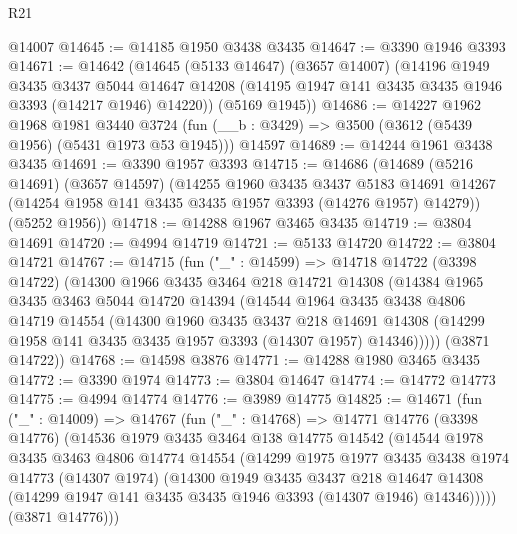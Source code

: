 \begin{lexlean}{R21}
\begin{coremodule}
    @14007
@14645 := @14185 @1950 @3438 @3435
@14647 := @3390 @1946 @3393
@14671 := @14642
    (@14645
      (@5133 @14647)
      (@3657 @14007)
      (@14196
        @1949
        @3435
        @3437
        @5044
        @14647
        @14208
        (@14195 @1947 @141 @3435 @3435 @1946 @3393 (@14217 @1946) @14220))
      (@5169 @1945))
@14686 := @14227
    @1962
    @1968
    @1981
    @3440
    @3724
    (fun (__b : @3429) => @3500 (@3612 (@5439 @1956) (@5431 @1973 @53 @1945)))
    @14597
@14689 := @14244 @1961 @3438 @3435
@14691 := @3390 @1957 @3393
@14715 := @14686
    (@14689
      (@5216 @14691)
      (@3657 @14597)
      (@14255
        @1960
        @3435
        @3437
        @5183
        @14691
        @14267
        (@14254 @1958 @141 @3435 @3435 @1957 @3393 (@14276 @1957) @14279))
      (@5252 @1956))
@14718 := @14288 @1967 @3465 @3435
@14719 := @3804 @14691
@14720 := @4994 @14719
@14721 := @5133 @14720
@14722 := @3804 @14721
@14767 := @14715
    (fun ("_" : @14599) =>
    @14718
      @14722
      (@3398 @14722)
      (@14300
        @1966
        @3435
        @3464
        @218
        @14721
        @14308
        (@14384
          @1965
          @3435
          @3463
          @5044
          @14720
          @14394
          (@14544
            @1964
            @3435
            @3438
            @4806
            @14719
            @14554
            (@14300
              @1960
              @3435
              @3437
              @218
              @14691
              @14308
              (@14299 @1958 @141 @3435 @3435 @1957 @3393 (@14307 @1957) @14346)))))
      (@3871 @14722))
@14768 := @14598 @3876
@14771 := @14288 @1980 @3465 @3435
@14772 := @3390 @1974
@14773 := @3804 @14647
@14774 := @14772 @14773
@14775 := @4994 @14774
@14776 := @3989 @14775
@14825 := @14671
    (fun ("_" : @14009) =>
    @14767
      (fun ("_" : @14768) =>
      @14771
        @14776
        (@3398 @14776)
        (@14536
          @1979
          @3435
          @3464
          @138
          @14775
          @14542
          (@14544
            @1978
            @3435
            @3463
            @4806
            @14774
            @14554
            (@14299
              @1975
              @1977
              @3435
              @3438
              @1974
              @14773
              (@14307 @1974)
              (@14300
                @1949
                @3435
                @3437
                @218
                @14647
                @14308
                (@14299 @1947 @141 @3435 @3435 @1946 @3393 (@14307 @1946) @14346)))))
        (@3871 @14776)))

\end{coremodule}
\end{lexlean}
